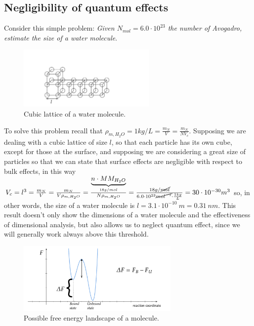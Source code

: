 \documentclass[../main/main.tex]{subfiles}
\begin{document}
\subsection{Negligibility of quantum effects}
Consider this simple problem: \emph{Given $N_{mol} = 6.0\cdot10^{23}$ the number of Avogadro, estimate the size of a water molecule}. 

\begin{figure}
    \centering
    \includegraphics[width=0.6\textwidth]{../frontespizio/tikz/1_lesson/exercise.pdf}
    \caption{\label{fig:water} Cubic lattice of a water molecule.}
\end{figure}

To solve this problem recall that $\rho_{m, H_2O}=1kg/L = \frac{m_N}{V}=\frac{m_N}{NV_c}$. Supposing we are dealing with a cubic lattice of size $l$, so that each particle has its own cube, except for those at the surface, and supposing we are considering a great size of particles so that we can state that surface effects are negligible with respect to bulk effects, in this way $V_c = l^3=\frac{m_N}{V}=\frac{m_N}{V\rho_{m, H_2 O}}=\frac{\underbrace{n\cdot MM_{H_2 O}}_{18g/mol}}{N\rho_{m,H_2 O}}=\frac{18g/\cancel{mol}}{6.0\cdot10^{23}\cancel{mol^{-1}}\cdot\frac{1kg}{L}}=30\cdot10^{-30}m^3$ so, in other words, the size of a water molecule is $l=3.1\cdot 10^{-10}\:m=0.31\:nm$. 
This result doesn't only show the dimensions of a water molecule and the effectiveness of dimensional analysis, but also allows us to neglect quantum effect, since we will generally work always above this threshold.

\begin{figure}[h!]
    \centering
    \includegraphics[width=0.7\textwidth]{../frontespizio/tikz/1_lesson/free_energy.pdf}
    \caption{Possible free energy landscape of a molecule.}
\end{figure}
\end{document}
